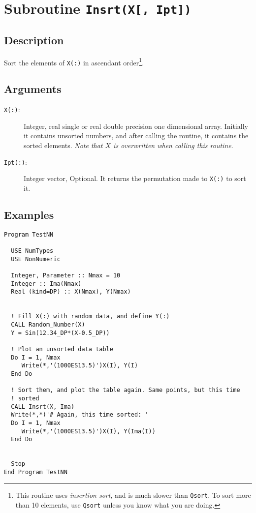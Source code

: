 \section{Subroutine \texttt{Insrt(X[, Ipt])}}

\subsection{Description}

Sort the elements of \texttt{X(:)} in ascendant order\footnote{This
  routine uses \emph{insertion sort}, and is much slower than
  \texttt{Qsort}. To sort more than 10 elements, use \texttt{Qsort}
  unless you know what you are doing.}. 

\subsection{Arguments}

\begin{description}
\item[\texttt{X(:)}: ] Integer, real single or real double precision one
  dimensional array. Initially it contains unsorted numbers, and after
  calling the routine, it contains the sorted elements. \emph{Note that
    $X$ is overwritten when calling this routine}. 
\item[\texttt{Ipt(:)}: ] Integer vector, Optional. It returns the
  permutation made to \texttt{X(:)} to sort it.
\end{description}

\subsection{Examples}

\begin{lstlisting}[emph=Insrt,
                   emphstyle=\color{blue},
                   frame=trBL,
                   caption=Sorting data.,
                   label=insrt]
Program TestNN

  USE NumTypes
  USE NonNumeric

  Integer, Parameter :: Nmax = 10
  Integer :: Ima(Nmax)
  Real (kind=DP) :: X(Nmax), Y(Nmax)


  ! Fill X(:) with random data, and define Y(:)
  CALL Random_Number(X)
  Y = Sin(12.34_DP*(X-0.5_DP))

  ! Plot an unsorted data table
  Do I = 1, Nmax
     Write(*,'(1000ES13.5)')X(I), Y(I)
  End Do

  ! Sort them, and plot the table again. Same points, but this time
  ! sorted 
  CALL Insrt(X, Ima)
  Write(*,*)'# Again, this time sorted: '
  Do I = 1, Nmax
     Write(*,'(1000ES13.5)')X(I), Y(Ima(I))
  End Do


  Stop
End Program TestNN
\end{lstlisting}


